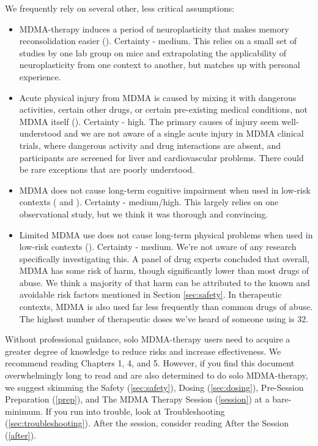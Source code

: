 \documentclass[12pt,letterpaper]{book}
\begin{document}
We frequently rely on several other, less critical assumptions:
\begin{itemize}
	\item MDMA-therapy induces a period of neuroplasticity that makes memory reconsolidation easier (\textcite{nardouMDMAPlasticity}). Certainty - medium. This relies on a small set of studies by one lab group on mice and extrapolating the applicability of neuroplasticity from one context to another, but matches up with personal experience.
	\item Acute physical injury from MDMA is caused by mixing it with dangerous activities, certain other drugs, or certain pre-existing medical conditions, not MDMA itself (\textcite{riggDeaths}). Certainty - high. The primary causes of injury seem well-understood and we are not aware of a single acute injury in MDMA clinical trials, where dangerous activity and drug interactions are absent, and participants are screened for liver and cardiovascular problems. There could be rare exceptions that are poorly understood.
	\item MDMA does not cause long-term cognitive impairment when used in low-risk contexts (\textcite{halpernMormonRavers} and \textcite{passieHistory}). Certainty - medium/high. This largely relies on one observational study, but we think it was thorough and convincing.
	\item Limited MDMA use does not cause long-term physical problems when used in low-risk contexts (\textcite{nuttDrugHarms}). Certainty - medium. We're not aware of any research specifically investigating this. A panel of drug experts concluded that overall, MDMA has some risk of harm, though significantly lower than most drugs of abuse. We think a majority of that harm can be attributed to the known and avoidable risk factors mentioned in Section \ref{sec:safety}. In therapeutic contexts, MDMA is also used far less frequently than common drugs of abuse. The highest number of therapeutic doses we've heard of someone using is 32.
\end{itemize}

Without professional guidance, solo MDMA-therapy users need to acquire a greater degree of knowledge to reduce risks and increase effectiveness. We recommend reading Chapters 1, 4, and 5. However, if you find this document overwhelmingly long to read and are also determined to do solo MDMA-therapy, we suggest skimming the Safety (\ref{sec:safety}), Dosing (\ref{sec:dosing}), Pre-Session Preparation (\ref{prep}), and The MDMA Therapy Session (\ref{session}) at a bare-minimum. If you run into trouble, look at Troubleshooting (\ref{sec:troubleshooting}). After the session, consider reading After the Session (\ref{after}).
\end{document}
